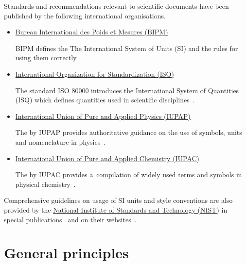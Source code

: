 \documentclass[12pt,a4paper]{article}
\begin{document}
Standards and recommendations relevant to scientific documents have been published by the following international organisations.
\begin{itemize}
\item \href{https://www.bipm.org}{Bureau International des Poids et Mesures (BIPM)}

BIPM defines the The International System of Units (SI) and the rules for using them correctly~\cite{bipm-si-brochure}.

\item \href{https://www.iso.org}{International Organization for Standardization (ISO)}

The standard ISO 80000 introduces the International System of Quantities (ISQ) which defines quantities used in scientific disciplines~\cite{iso-80000-1}.

\item \href{http://iupap.org}{International Union of Pure and Applied Physics (IUPAP)}

The  by IUPAP provides authoritative guidance on the use of symbols, units and nomenclature in physics~\cite{iupap-red-book}.

\item \href{https://iupac.org}{International Union of Pure and Applied Chemistry (IUPAC)}

The  by IUPAC provides a~compilation of widely used terms and symbols in physical chemistry~\cite{iupac-green-book}.
\end{itemize}
Comprehensive guidelines on usage of SI units and style conventions are also provided by the \href{https://www.nist.gov}{National Institute of Standards and Technology (NIST)} in special publications~\cite{nist-si,nist-si-guide} and on their websites~\cite{nist-units}.

\section{General principles}
\end{document}
